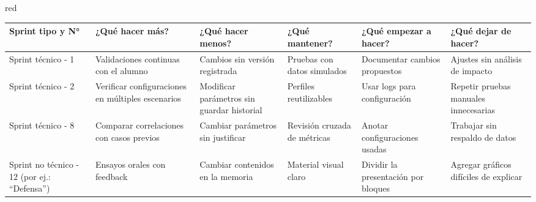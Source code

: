 \begin{consigna}{red}
\begin{table}[htpb]
\renewcommand{\arraystretch}{1.4}
\begin{tabular}{|>{\raggedright\arraybackslash}p{1.8cm}|
                >{\raggedright\arraybackslash}p{2.3cm}|
                >{\raggedright\arraybackslash}p{2.3cm}|
                >{\raggedright\arraybackslash}p{2.3cm}|
                >{\raggedright\arraybackslash}p{2.3cm}|
                >{\raggedright\arraybackslash}p{2.3cm}|}
\hline
\rowcolor[HTML]{CCCCCC} 
\textbf{Sprint tipo y N°} & \textbf{¿Qué hacer más?} & \textbf{¿Qué hacer menos?} & \textbf{¿Qué mantener?} & \textbf{¿Qué empezar a hacer?} & \textbf{¿Qué dejar de hacer?} \\
\hline
Sprint técnico - 1 & Validaciones continuas con el alumno & Cambios sin versión registrada & Pruebas con datos simulados & Documentar cambios propuestos & Ajustes sin análisis de impacto \\
\hline
Sprint técnico - 2 & Verificar configuraciones en múltiples escenarios & Modificar parámetros sin guardar historial & Perfiles reutilizables & Usar logs para configuración & Repetir pruebas manuales innecesarias \\
\hline
Sprint técnico - 8 & Comparar correlaciones con casos previos & Cambiar parámetros sin justificar & Revisión cruzada de métricas & Anotar configuraciones usadas & Trabajar sin respaldo de datos \\
\hline
Sprint no técnico - 12 (por ej.: ``Defensa'') & Ensayos orales con feedback & Cambiar contenidos en la memoria & Material visual claro & Dividir la presentación por bloques & Agregar gráficos difíciles de explicar \\
\hline
\end{tabular}
\end{table}
\end{consigna}
